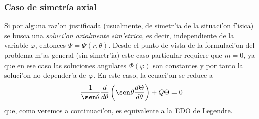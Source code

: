 \subsubsection{Caso de simetr\'ia axial}
Si por alguna raz'on justificada (usualmente, de simetr'ia de la situaci'on f'isica) se busca una \textit{soluci'on axialmente sim'etrica}, es decir, independiente de la variable $\varphi$, entonces $\Psi=\Psi(r,\theta)$. Desde el punto de vista de la formulaci'on del problema m'as general (sin simetr'ia) este caso particular requiere que $m=0$, ya que en ese caso las soluciones angulares $\Phi(\varphi)$ son constantes y por tanto la soluci'on no depender'a de $\varphi$. En este caso, la ecuaci'on se reduce a
\begin{equation}
\frac{1}{\sen\theta}\frac{d}{d\theta}\left(\sen\theta\frac{d\Theta}{d\theta}\right)
+Q\Theta = 0
\end{equation}
que, como veremos a continuaci'on, es equivalente a la EDO de Legendre.